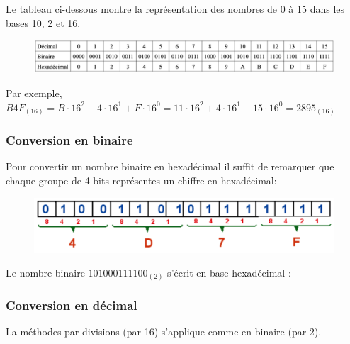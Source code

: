 Le tableau ci-dessous montre la représentation des nombres de 0 à 15 dans les bases 10, 2 et 16.

\begin{figure}[h]
	\begin{center}
		\includegraphics[scale=.5]{Images/intro/tableaubase}
	\end{center}
\end{figure}


Par exemple, $B4F_{(16)}= B \cdot 16^2 + 4 \cdot 16^1 + F\cdot 16^0= 11 \cdot 16^2 + 4 \cdot 16^1 + 15\cdot 16^0=2 895_{(16)}$

\subsubsection{Conversion en binaire}

Pour convertir un nombre binaire en hexadécimal il suffit de remarquer que chaque groupe de 4 bits représentes un chiffre en hexadécimal:

\begin{figure}[h]
	\begin{center}
		\includegraphics[scale=.5]{Images/intro/hexadecimal}
	\end{center}
\end{figure}

\begin{myexample}
	Le  nombre binaire $101000111100_{(2)}$ s'écrit en base hexadécimal :
	\vspace{2cm}

\end{myexample}

\subsubsection{Conversion en décimal}

La méthodes par divisions (par 16) s'applique comme en binaire (par 2).

